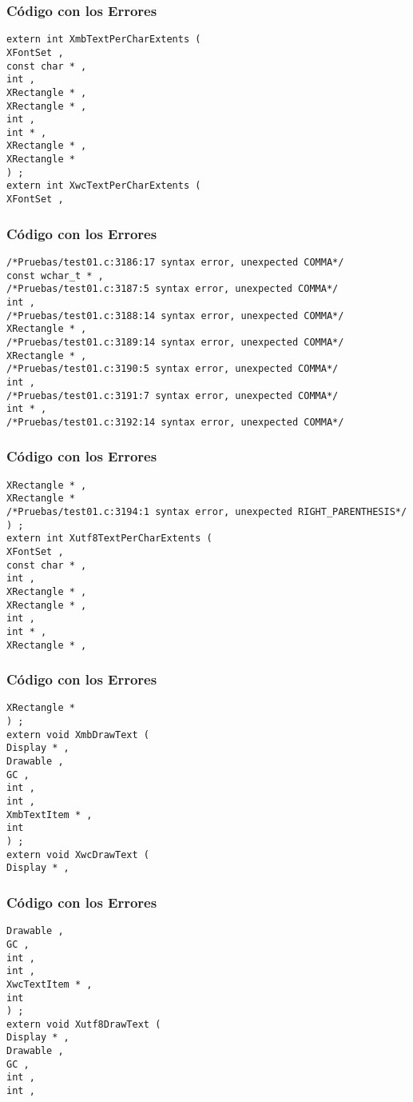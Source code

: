 \documentclass{beamer}
\begin{document}
\begin{frame}[fragile]
\frametitle{C\'odigo con los Errores}
\begin{verbatim}
extern int XmbTextPerCharExtents ( 
XFontSet , 
const char * , 
int , 
XRectangle * , 
XRectangle * , 
int , 
int * , 
XRectangle * , 
XRectangle * 
) ; 
extern int XwcTextPerCharExtents ( 
XFontSet , 
\end{verbatim}
\end{frame}
\begin{frame}[fragile]
\frametitle{C\'odigo con los Errores}
\begin{verbatim}
/*Pruebas/test01.c:3186:17 syntax error, unexpected COMMA*/
const wchar_t * , 
/*Pruebas/test01.c:3187:5 syntax error, unexpected COMMA*/
int , 
/*Pruebas/test01.c:3188:14 syntax error, unexpected COMMA*/
XRectangle * , 
/*Pruebas/test01.c:3189:14 syntax error, unexpected COMMA*/
XRectangle * , 
/*Pruebas/test01.c:3190:5 syntax error, unexpected COMMA*/
int , 
/*Pruebas/test01.c:3191:7 syntax error, unexpected COMMA*/
int * , 
/*Pruebas/test01.c:3192:14 syntax error, unexpected COMMA*/
\end{verbatim}
\end{frame}
\begin{frame}[fragile]
\frametitle{C\'odigo con los Errores}
\begin{verbatim}
XRectangle * , 
XRectangle * 
/*Pruebas/test01.c:3194:1 syntax error, unexpected RIGHT_PARENTHESIS*/
) ; 
extern int Xutf8TextPerCharExtents ( 
XFontSet , 
const char * , 
int , 
XRectangle * , 
XRectangle * , 
int , 
int * , 
XRectangle * , 
\end{verbatim}
\end{frame}
\begin{frame}[fragile]
\frametitle{C\'odigo con los Errores}
\begin{verbatim}
XRectangle * 
) ; 
extern void XmbDrawText ( 
Display * , 
Drawable , 
GC , 
int , 
int , 
XmbTextItem * , 
int 
) ; 
extern void XwcDrawText ( 
Display * , 
\end{verbatim}
\end{frame}
\begin{frame}[fragile]
\frametitle{C\'odigo con los Errores}
\begin{verbatim}
Drawable , 
GC , 
int , 
int , 
XwcTextItem * , 
int 
) ; 
extern void Xutf8DrawText ( 
Display * , 
Drawable , 
GC , 
int , 
int , 
\end{verbatim}
\end{frame}
\end{document}
